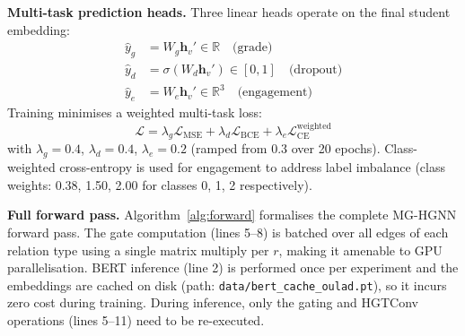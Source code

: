 \documentclass[sigconf,review]{acmart}
\begin{document}
\textbf{Multi-task prediction heads.}
Three linear heads operate on the final student
embedding:
\begin{align}
  \hat{y}_g &= W_g \mathbf{h}_v'
    \in \mathbb{R} \quad \text{(grade)} \\
  \hat{y}_d &= \sigma(W_d \mathbf{h}_v')
    \in [0,1] \quad \text{(dropout)} \\
  \hat{y}_e &= W_e \mathbf{h}_v'
    \in \mathbb{R}^3 \quad \text{(engagement)}
\end{align}
Training minimises a weighted multi-task loss:
\begin{equation}
  \mathcal{L} = \lambda_g \mathcal{L}_{\text{MSE}}
  + \lambda_d \mathcal{L}_{\text{BCE}}
  + \lambda_e \mathcal{L}_{\text{CE}}^{\text{weighted}}
  \label{eq:loss}
\end{equation}
with $\lambda_g = 0.4$, $\lambda_d = 0.4$,
$\lambda_e = 0.2$ (ramped from 0.3 over 20 epochs).
Class-weighted cross-entropy is used for engagement
to address label imbalance (class weights: 0.38,
1.50, 2.00 for classes 0, 1, 2 respectively).

\textbf{Full forward pass.}
Algorithm~\ref{alg:forward} formalises the complete
MG-HGNN forward pass. The gate computation
(lines 5--8) is batched over all edges of each
relation type using a single matrix multiply per
$r$, making it amenable to GPU parallelisation.
BERT inference (line 2) is performed once per
experiment and the embeddings are cached on disk
(path: \texttt{data/bert\_cache\_oulad.pt}),
so it incurs zero cost during training. During
inference, only the gating and HGTConv operations
(lines 5--11) need to be re-executed.
\end{document}
